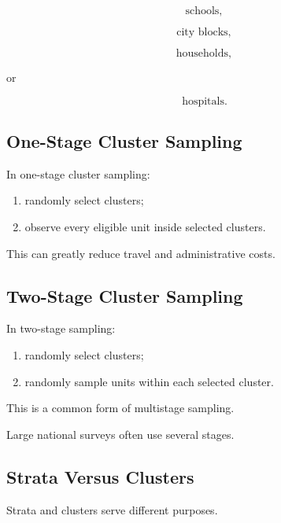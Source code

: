 \[
\text{schools},
\]

\[
\text{city blocks},
\]

\[
\text{households},
\]

or

\[
\text{hospitals}.
\]

\subsection{One-Stage Cluster Sampling}
\label{subsec:one-stage-cluster-sampling}

In one-stage cluster sampling:

\begin{enumerate}
    \item randomly select clusters;
    \item observe every eligible unit inside selected clusters.
\end{enumerate}

This can greatly reduce travel and administrative costs.

\subsection{Two-Stage Cluster Sampling}
\label{subsec:two-stage-cluster-sampling}

In two-stage sampling:

\begin{enumerate}
    \item randomly select clusters;
    \item randomly sample units within each selected cluster.
\end{enumerate}

This is a common form of multistage sampling.

Large national surveys often use several stages.

\subsection{Strata Versus Clusters}
\label{subsec:strata-versus-clusters}

Strata and clusters serve different purposes.

